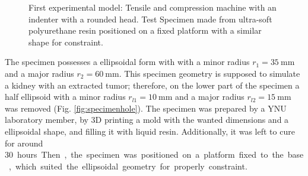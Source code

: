 \begin{figure}%
    \centering
   \qquad
   \caption{First experimental model: Tensile and compression machine with an indenter with a rounded head. Test Specimen made from ultra-soft polyurethane resin positioned on a fixed platform with a similar shape for constraint.}%
   \label{fig:firstexperiment}%
\end{figure}

The specimen possesses a ellipsoidal form with 
with a minor radius $r_1 = \SI{35}{\milli \m}$ and a major radius $r_2 = \SI{60}{\milli \m}$. 
This specimen geometry is supposed to simulate a kidney with an extracted tumor; therefore,
on the lower part of the specimen a half ellipsoid with a minor radius $r_{l1} = \SI{10}{\milli \m}$ 
and a major radius $r_{l2} = \SI{15}{\milli \m}$ was removed (Fig. \ref{fig:specimenhole}). 
The specimen was prepared by a YNU laboratory member, by 3D printing a mold with the wanted dimensions
 and a ellipsoidal shape, and filling it with liquid resin. 
 Additionally, it was left to cure for around \SI{30} hours. 
Then, the specimen was positioned on a platform fixed to the base, which suited 
the ellipsoidal geometry for properly constraint. 

